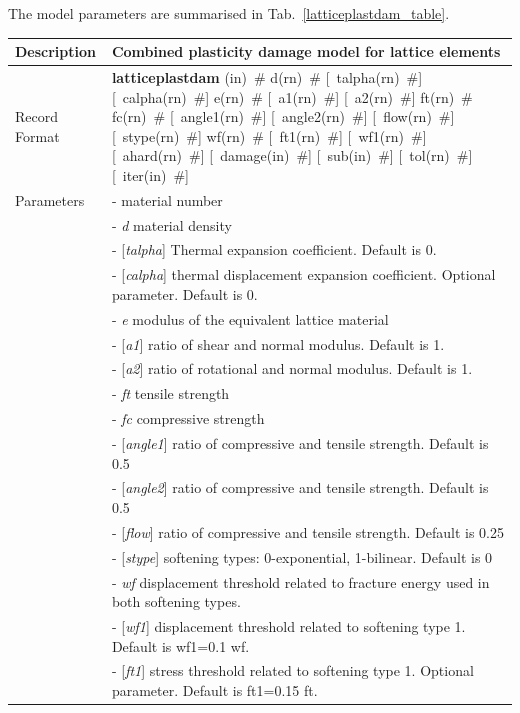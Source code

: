 \documentclass[a4paper]{article}
\newcommand{\descitem}[1]{{\noindent \bf #1}}
\newcommand{\elemparam}[2]{{{#1\tiny (#2)}~\#}}
\newcommand{\optelemparam}[2]{[{~\elemparam{#1}{#2}}]}
\newcommand{\param}[1]{{\it #1}}
\newcommand{\optparam}[1]{[{\it #1}]}
\newenvironment{mmt}{\begin{tabular}{|l|p{9cm}|}}{\end{tabular}\\}
\newenvironment{mmt}{\begin{tabular}{|l|l|}}{\end{tabular}\\}
\begin{document}
The model parameters are summarised in Tab.~\ref{latticeplastdam_table}.

\begin{table}[!htb]
\begin{mmt}
\hline
Description & Combined plasticity damage model for lattice elements \\
\hline
Record Format & \descitem{latticeplastdam} \elemparam{}{in} 
\elemparam{d}{rn} \optelemparam{talpha}{rn} \optelemparam{calpha}{rn} \elemparam{e}{rn} \optelemparam{a1}{rn} \optelemparam{a2}{rn} \elemparam{ft}{rn}  \elemparam{fc}{rn} \optelemparam{angle1}{rn}  \optelemparam{angle2}{rn} \optelemparam{flow}{rn} \optelemparam{stype}{rn} \elemparam{wf}{rn} \optelemparam{ft1}{rn} \optelemparam{wf1}{rn}  \optelemparam{ahard}{rn} \optelemparam{damage}{in}  \optelemparam{sub}{in}  \optelemparam{tol}{rn}  \optelemparam{iter}{in}\\
Parameters &- \param{} material number\\
&- \param{d} material density\\
&- \optparam{talpha} Thermal expansion coefficient. Default is 0.\\
&- \optparam{calpha} thermal displacement expansion coefficient. Optional parameter. Default is 0.\\
&- \param{e} modulus of the equivalent lattice material\\
&- \optparam{a1} ratio of shear and normal modulus. Default is 1.\\
&- \optparam{a2} ratio of rotational and normal modulus. Default is 1.\\
&- \param{ft} tensile strength\\
&- \param{fc} compressive strength\\
&- \optparam{angle1} ratio of compressive and tensile strength. Default is 0.5\\
&- \optparam{angle2} ratio of compressive and tensile strength. Default is 0.5\\
&- \optparam{flow} ratio of compressive and tensile strength. Default is 0.25\\
&- \optparam{stype} softening types: 0-exponential, 1-bilinear. Default is 0\\
&- \param{wf} displacement threshold related to fracture energy used in both softening types.\\
&- \optparam{wf1} displacement threshold related to softening type 1. Default is wf1=0.1 wf.\\
&- \optparam{ft1} stress threshold related to softening type 1. Optional parameter. Default is ft1=0.15 ft.\\

\end{mmt}
\end{table}
\end{document}
